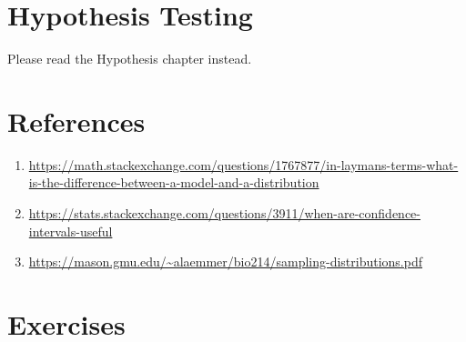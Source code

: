 \section{Hypothesis Testing}
Please read the Hypothesis chapter instead. \\

\section{References}
\begin{enumerate}
    \item  \url{https://math.stackexchange.com/questions/1767877/in-laymans-terms-what-is-the-difference-between-a-model-and-a-distribution}
    \item \url{https://stats.stackexchange.com/questions/3911/when-are-confidence-intervals-useful}
    \item \url{https://mason.gmu.edu/~alaemmer/bio214/sampling-distributions.pdf}
    \end{enumerate} 
\section{Exercises}
